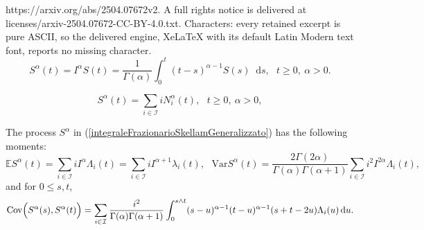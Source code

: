 \documentclass[10pt,a4paper]{amsart}
\newcommand*\dif{\mathop{}\!\mathrm{d}}  %
\begin{document}
https://arxiv.org/abs/2504.07672v2. A full rights notice is delivered at licenses/arxiv-2504.07672-CC-BY-4.0.txt. Characters: every retained excerpt is pure ASCII, so the delivered engine, XeLaTeX with its default Latin Modern text font, reports no missing character.
\begin{equation}\label{integraleFrazionarioSkellamGeneralizzato}
S^\alpha (t) = I^\alpha S(t) =  \frac{1}{\Gamma(\alpha)} \int_0^t (t-s)^{\alpha-1} S(s)\dif s,\ \ \ t\ge0,\ \alpha>0.
\end{equation}

\begin{equation}\label{integraleSkellamGeneralizzatoInTerminiDiPoisson}
S^{\alpha}(t) = \sum_{i\in\mathcal{I}} i N_i^\alpha(t),\ \ \ t\ge0,\ \alpha>0,
\end{equation}

\begin{proposition}
The process $S^\alpha$ in (\ref{integraleFrazionarioSkellamGeneralizzato}) has the following moments:
\begin{equation}\label{momentiPrimoSecondoIntegraleSkellamGeneralizzatoNonOmogeneo}
\mathbb{E}S^\alpha(t) = \sum_{i\in\mathcal{I}} i I^\alpha \Lambda_i(t) =  \sum_{i\in\mathcal{I}} i I^{\alpha+1} \lambda_i(t), \ \ \  \text{Var}S^\alpha(t) = \frac{2\Gamma(2\alpha)}{\Gamma(\alpha)\Gamma(\alpha+1)}\sum_{i\in\mathcal{I}} i^2 I^{2\alpha}\Lambda_i(t),  
\end{equation} 
and for $0\le s,t$,
\begin{equation}\label{covarianzaIntegraleSkellamGeneralizzato}
 \text{Cov}\Bigl( S^\alpha(s),S^\alpha(t)\Bigr) = \sum_{i\in\mathcal{I}} \frac{i^2}{\Gamma(\alpha)\Gamma(\alpha+1)}\int_0^{s\wedge t} (s-u)^{\alpha-1}(t-u)^{\alpha-1}(s+t-2u)\Lambda_{i}(u)\dif u.
\end{equation}
\end{proposition}
\end{document}
